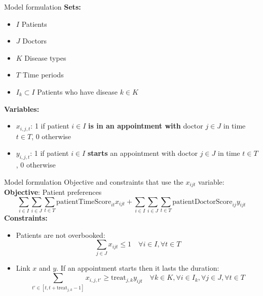 \documentclass{beamer}
\begin{document}
\begin{frame}{Model formulation}
    \textbf{Sets:}    
    \begin{itemize}
        \item $I$ Patients
        \item $J$ Doctors
        \item $K$ Disease types
        \item $T$ Time periods
        \item $I_k \subset I$ Patients who have disease $k 
        \in K$
    \end{itemize}
    \textbf{Variables:}
    \begin{itemize}
        \item $x_{i,j,t}$: 1 if patient $i \in I$ \textbf{is in an appointment with} doctor $j \in J$ in time $t \in T$, 0 otherwise
        \item $y_{i,j,t}$: 1 if patient $i \in I$ \textbf{starts} an appointment with doctor $j \in J$ in time $t \in T$, 0 otherwise
    \end{itemize} 
\end{frame}

\begin{frame}{Model formulation}
    Objective and constraints that use the $x_{ijt}$ variable: \\
    \vspace{1em}
    \textbf{Objective}: Patient preferences
        $$ \sum_{i\in I} \sum_{i\in J} \sum_{t\in T} \text{patientTimeScore}_{it} x_{ijt} + \sum_{i\in I} \sum_{i\in J} \sum_{t\in T} \text{patientDoctorScore}_{ij} y_{ijt}$$
    \textbf{Constraints:}
    \begin{itemize}
        \item Patients are not overbooked: 
        $$
        \sum_{j \in J} x_{ijt} \le 1 \quad
         \forall i \in I, \forall t \in T$$
        \item Link $x$ and $y$. If an appointment starts then it lasts the duration:
        $$
        \sum_{t'\in [t, t +\mathrm{treat}_{j,k}-1]} x_{i,j,t'} \ge \mathrm{treat}_{j,k} y_{ijt} \quad \forall k \in K, \forall i\in I_k, \forall j \in J, \forall t \in T
        $$
    \end{itemize}
\end{frame}
\end{document}
